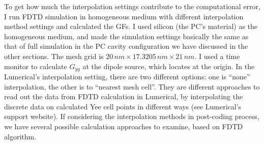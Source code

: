 To get how much the interpolation settings contribute to the computational error, I run FDTD simulation in homogeneous medium with different interpolation method settings and calculated the GFs. I used silicon (the PC's material) as the homogeneous medium, and made the simulation settings basically the same as that of full simulation in the PC cavity configuration we have discussed in the other sections. The mesh grid is $20\, nm \times 17.3205\, nm \times 21\, nm$. I used a time monitor to calculate $G_{yy}$ at the dipole source, which locates at the origin. In the Lumerical's interpolation setting, there are two different options: one is ``none'' interpolation, the other is to ``nearest mesh cell''. They are different approaches to read out the data from FDTD calculation in Lumerical, by interpolating the discrete data on calculated Yee cell points in different ways (see Lumerical's support website). If considering the interpolation methods in post-coding process, we have several possible calculation approaches to examine, based on FDTD algorithm.

